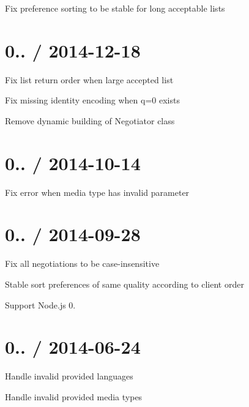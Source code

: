 
\begin{DoxyItemize}
\item Fix preference sorting to be stable for long acceptable lists
\end{DoxyItemize}

\section*{0.. / 2014-\/12-\/18 }


\begin{DoxyItemize}
\item Fix list return order when large accepted list
\item Fix missing identity encoding when q=0 exists
\item Remove dynamic building of Negotiator class
\end{DoxyItemize}

\section*{0.. / 2014-\/10-\/14 }


\begin{DoxyItemize}
\item Fix error when media type has invalid parameter
\end{DoxyItemize}

\section*{0.. / 2014-\/09-\/28 }


\begin{DoxyItemize}
\item Fix all negotiations to be case-\/insensitive
\item Stable sort preferences of same quality according to client order
\item Support Node.\+js 0.
\end{DoxyItemize}

\section*{0.. / 2014-\/06-\/24 }


\begin{DoxyItemize}
\item Handle invalid provided languages
\item Handle invalid provided media types
\end{DoxyItemize}

